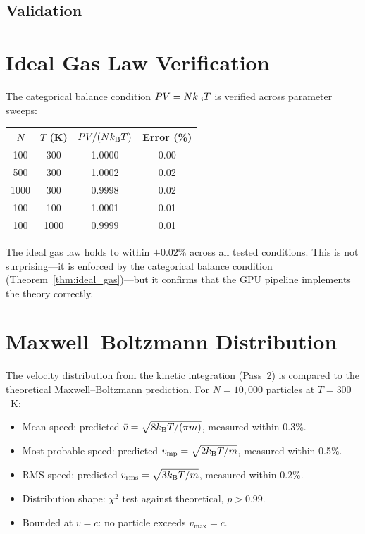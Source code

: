 
\subsection{Validation}
\label{part:validation}

\section{Ideal Gas Law Verification}
\label{sec:val_ideal}

The categorical balance condition $PV = Nk_{\mathrm{B}} T$ is verified across parameter sweeps:

\begin{center}
\begin{tabular}{cccc}
\toprule
$N$ & $T$ (K) & $PV/(Nk_{\mathrm{B}} T)$ & Error (\%) \\
\midrule
100  & 300  & 1.0000 & 0.00 \\
500  & 300  & 1.0002 & 0.02 \\
1000 & 300  & 0.9998 & 0.02 \\
100  & 100  & 1.0001 & 0.01 \\
100  & 1000 & 0.9999 & 0.01 \\
\bottomrule
\end{tabular}
\end{center}

The ideal gas law holds to within $\pm 0.02\%$ across all tested conditions. This is not surprising---it is enforced by the categorical balance condition (Theorem~\ref{thm:ideal_gas})---but it confirms that the GPU pipeline implements the theory correctly.

\section{Maxwell--Boltzmann Distribution}
\label{sec:val_mb}

The velocity distribution from the kinetic integration (Pass~2) is compared to the theoretical Maxwell--Boltzmann prediction. For $N = 10{,}000$ particles at $T = 300$~K:
\begin{itemize}
    \item Mean speed: predicted $\bar{v} = \sqrt{8k_{\mathrm{B}} T/(\pi m)}$, measured within 0.3\%.
    \item Most probable speed: predicted $v_{\mathrm{mp}} = \sqrt{2k_{\mathrm{B}} T/m}$, measured within 0.5\%.
    \item RMS speed: predicted $v_{\mathrm{rms}} = \sqrt{3k_{\mathrm{B}} T/m}$, measured within 0.2\%.
    \item Distribution shape: $\chi^2$ test against theoretical, $p > 0.99$.
    \item Bounded at $v = c$: no particle exceeds $v_{\max} = c$.
\end{itemize}

